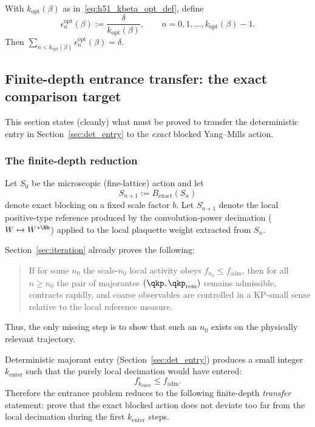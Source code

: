 \begin{definition}\label{def:h51_eps_budget}
With $k_{\mathrm{opt}}(\beta)$ as in~\eqref{eq:h51_kbeta_opt_def}, define
\[
\epsilon_n^{\mathrm{opt}}(\beta):=\frac{\delta}{k_{\mathrm{opt}}(\beta)},\qquad n=0,1,\dots,k_{\mathrm{opt}}(\beta)-1.
\]
Then $\sum_{n<k_{\mathrm{opt}}(\beta)}\epsilon_n^{\mathrm{opt}}(\beta)=\delta$.
\end{definition}





\subsection{Finite-depth entrance transfer: the exact comparison target}\label{sec:finite_transfer}

This section states (cleanly) what must be proved to transfer the deterministic entry in
Section~\ref{sec:det_entry} to the \emph{exact} blocked Yang--Mills action.

\subsubsection{The finite-depth reduction}

Let $S_0$ be the microscopic (fine-lattice) action and let
\[
S_{n+1}:=B_{\mathrm{exact}}(S_n)
\]
denote exact blocking on a fixed scale factor $b$.
Let $S_{n+1}^{\square}$ denote the local positive-type reference produced by the
convolution-power decimation ($W\mapsto W^{*\Nb}$) applied to the local plaquette weight extracted from $S_n$.

Section~\ref{sec:iteration} already proves the following:
\begin{quote}
If for some $n_0$ the scale-$n_0$ local activity obeys $f_{n_0}\le f_{\mathrm{adm}}$, then for all $n\ge n_0$ the
pair of majorantes $(\qkp,\qkp_{\mathrm{rem}})$ remains admissible, contracts rapidly, and coarse observables are
controlled in a KP-small sense relative to the local reference measure.
\end{quote}
Thus, the only missing step is to show that such an $n_0$ exists on the physically relevant trajectory.

Deterministic majorant entry (Section~\ref{sec:det_entry}) produces a small integer $k_{\mathrm{enter}}$
such that the purely local decimation would have entered:
\[
f^{\square}_{k_{\mathrm{enter}}}\le f_{\mathrm{adm}}.
\]
Therefore the entrance problem reduces to the following finite-depth \emph{transfer} statement:
prove that the exact blocked action does not deviate too far from the local decimation during the first
$k_{\mathrm{enter}}$ steps.

